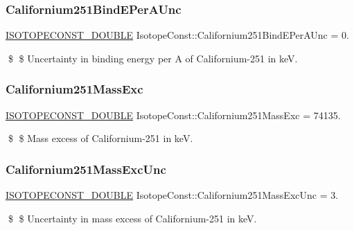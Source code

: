 \subsubsection{\texorpdfstring{Californium251\+Bind\+E\+Per\+A\+Unc}{Californium251BindEPerAUnc}}
{\footnotesize\ttfamily \mbox{\hyperlink{group___isotope_const-_macros_ga8f45a7272ce02c0b4c65c44636ed719a}{I\+S\+O\+T\+O\+P\+E\+C\+O\+N\+S\+T\+\_\+\+D\+O\+U\+B\+LE}} Isotope\+Const\+::\+Californium251\+Bind\+E\+Per\+A\+Unc = 0.}

\$ \$ Uncertainty in binding energy per A of Californium-\/251 in keV. \mbox{\label{group___isotope_const-_californium-_cf251_gaf8d81e1e06719836a0232ada9048964a}} 
\subsubsection{\texorpdfstring{Californium251\+Mass\+Exc}{Californium251MassExc}}
{\footnotesize\ttfamily \mbox{\hyperlink{group___isotope_const-_macros_ga8f45a7272ce02c0b4c65c44636ed719a}{I\+S\+O\+T\+O\+P\+E\+C\+O\+N\+S\+T\+\_\+\+D\+O\+U\+B\+LE}} Isotope\+Const\+::\+Californium251\+Mass\+Exc = 74135.}

\$ \$ Mass excess of Californium-\/251 in keV. \mbox{\label{group___isotope_const-_californium-_cf251_gacc3c061366ce06d54f7abbb8c8565ec4}} 
\subsubsection{\texorpdfstring{Californium251\+Mass\+Exc\+Unc}{Californium251MassExcUnc}}
{\footnotesize\ttfamily \mbox{\hyperlink{group___isotope_const-_macros_ga8f45a7272ce02c0b4c65c44636ed719a}{I\+S\+O\+T\+O\+P\+E\+C\+O\+N\+S\+T\+\_\+\+D\+O\+U\+B\+LE}} Isotope\+Const\+::\+Californium251\+Mass\+Exc\+Unc = 3.}

\$ \$ Uncertainty in mass excess of Californium-\/251 in keV. \mbox{\label{group___isotope_const-_californium-_cf251_gaf7d9d9b26c9785733231336c4da67841}} 
